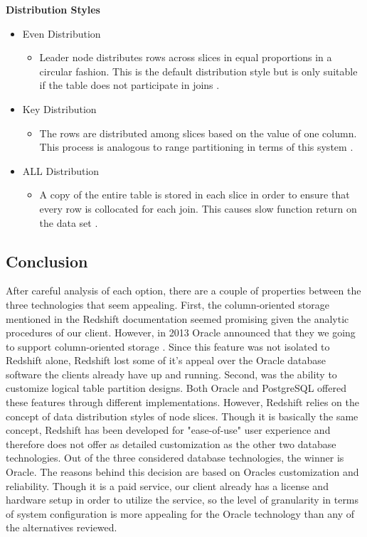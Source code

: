 \documentclass[draftclsnofoot, onecolumn, compsoc, 10pt]{IEEEtran}
\begin{document}
\textbf{Distribution Styles}
\begin{itemize} 
	\item  Even Distribution
    \begin{itemize} 
		\item Leader node distributes rows across slices in equal proportions in a circular fashion. This is the default distribution style 		but is only suitable  if the table does not participate in joins \cite{Choosing A Data Distribution Style}.
    \end{itemize}
    \item Key Distribution
    \begin{itemize} 
		\item The rows are distributed among slices based on the value of one column. This process is analogous to range partitioning in 			terms of this system \cite{Choosing A Data Distribution Style}.
    \end{itemize}
    \item ALL Distribution
    \begin{itemize} 
		\item A copy of the entire table is stored in each slice in order to ensure that every row is collocated for each join. This causes 		slow function return on the data set \cite{Choosing A Data Distribution Style}.
    \end{itemize}
\end{itemize}

\subsection{Conclusion}
After careful analysis of each option, there are a couple of properties between the three technologies that seem appealing. First, the column-oriented storage mentioned in the Redshift documentation seemed promising given the analytic procedures of our client. However, in 2013 Oracle announced that they we going to support column-oriented storage \cite{Column-Oriented Makeover}. Since this feature was not isolated to Redshift alone, Redshift lost some of it's appeal over the Oracle database software the clients already have up and running. Second, was the ability to customize logical table partition designs. Both Oracle and PostgreSQL offered these features through different implementations. However, Redshift relies on the concept of data distribution styles of node slices. Though it is basically the same concept, Redshift has been developed for "ease-of-use" user experience and therefore does not offer as detailed customization as the other two database technologies. Out of the three considered database technologies, the winner is Oracle. The reasons behind this decision are based on  Oracles customization and reliability. Though it is a paid service, our client already has a license and hardware setup in order to utilize the service, so the level of granularity in terms of system configuration is more appealing for the Oracle technology than any of the alternatives reviewed. 
\end{document}
